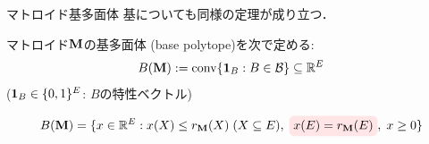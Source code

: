 \documentclass[14pt,aspectratio=169,xcolor=dvipsnames,table,onlytextwidth,dvipdfmx]{beamer}
\begin{document}
\begin{frame}{マトロイド基多面体}
    基についても同様の定理が成り立つ．

    \begin{definition}
        マトロイド$\mathbf{M}$の\alert{基多面体 (base polytope)}を次で定める:
        \[
            B(\mathbf{M}) := \operatorname{conv}\{\mathbf{1}_B: B \in \mathcal{B} \} \subseteq \mathbb{R}^E
        \]
        {\footnotesize \hfill ($\mathbf{1}_B \in \{0,1\}^E$: $B$の特性ベクトル)}
    \end{definition}

    \bigskip
    \begin{theorem}[Edmonds (1970)]
        \setlength{\abovedisplayskip}{0pt}
        \begin{align*}
            B(\bM) = \{x \in \R^E: x(X) \leq r_{\bM}(X) \; (X \subseteq E), \; \highlight{$x(E) = r_{\bM}(E)$}, \; x \geq 0 \}
        \end{align*}
    \end{theorem}
\end{frame}

\end{document}
